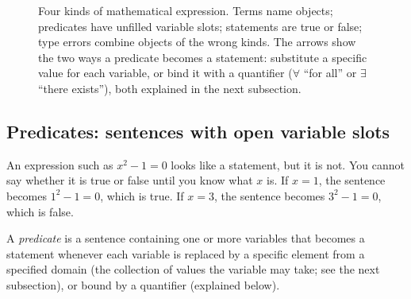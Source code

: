 \begin{figure}[htbp]
\caption{Four kinds of mathematical expression. Terms name objects; predicates have unfilled variable slots; statements are true or false; type errors combine objects of the wrong kinds. The arrows show the two ways a predicate becomes a statement: substitute a specific value for each variable, or bind it with a quantifier ($\forall$ ``for all'' or $\exists$ ``there exists''), both explained in the next subsection.}
\label{02:fig-expression-taxonomy}
\end{figure}

\subsection{Predicates: sentences with open variable slots}

An expression such as $x^2 - 1 = 0$ looks like a statement, but it is not. You cannot say whether it is true or false until you know what $x$ is. If $x = 1$, the sentence becomes $1^2 - 1 = 0$, which is true. If $x = 3$, the sentence becomes $3^2 - 1 = 0$, which is false.

\begin{definition}
A \emph{predicate} is a sentence containing one or more variables that becomes a statement whenever each variable is replaced by a specific element from a specified domain (the collection of values the variable may take; see the next subsection), or bound by a quantifier (explained below).
\end{definition}

